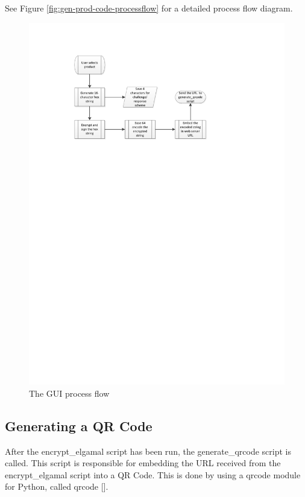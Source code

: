 See Figure \ref{fig:gen-prod-code-processflow} for a detailed process flow
diagram.

\begin{figure}
 \centering 
 \includegraphics[clip=true, trim
 = 0 550 0 70, scale=0.7]{generate_product_code_processflow}
 \caption{The GUI process flow}
 \label{fig:gen-prod-code-processflow.}
\end{figure}

\subsection{Generating a QR Code}
\label{sec:gen-qrcode}

After the encrypt\_elgamal script has been run, the generate\_qrcode script is
called. This script is responsible for embedding the URL received from the
encrypt\_elgamal script into a QR Code. This is done by using a qrcode module
for Python, called qrcode [\cite{website:qrcode-generator}].

